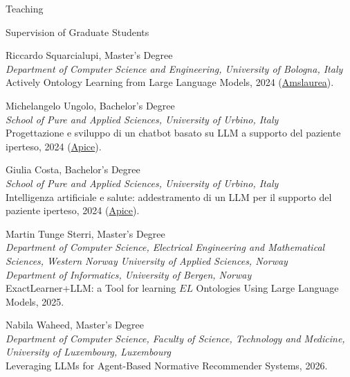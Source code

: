 \documentclass{resume} %
\begin{document}
\begin{rSection}{Teaching}
        \begin{rSubsection2}{Supervision of Graduate Students}

            \item Riccardo Squarcialupi, Master's Degree
            \\ \emph{\small{Department of Computer Science and Engineering, University of Bologna, Italy}}
            \\ Actively Ontology Learning from Large Language Models, 2024 (\href{https://amslaurea.unibo.it/id/eprint/32247/}{Amslaurea}).
            \item Michelangelo Ungolo, Bachelor's Degree
            \\ \emph{\small{School of Pure and Applied Sciences, University of Urbino, Italy}}
            \\ Progettazione e sviluppo di un chatbot basato su LLM a supporto del paziente iperteso, 2024 (\href{https://apice.unibo.it/xwiki/bin/view/Thesis/ChatbotLLMIpertensioneUngolo2024}{Apice}).
            \item Giulia Costa, Bachelor's Degree
            \\ \emph{\small{School of Pure and Applied Sciences, University of Urbino, Italy}}
            \\ Intelligenza artificiale e salute: addestramento di un LLM per il supporto del paziente iperteso, 2024 (\href{https://apice.unibo.it/xwiki/bin/view/Thesis/AddestramentoLLMPerPazienteIpertesoCosta2024}{Apice}).
            \item Martin Tunge Sterri, Master's Degree
            \\\emph{\small{Department of Computer Science, Electrical Engineering and Mathematical Sciences, Western Norway University of Applied Sciences, Norway}}
            \\\emph{\small{Department of Informatics, University of Bergen, Norway}}
            \\ExactLearner+LLM: a Tool for learning $EL$ Ontologies Using Large Language Models, 2025.
            \item Nabila Waheed, Master's Degree
            \\\emph{\small{Department of Computer Science, Faculty of Science, Technology and Medicine, University of Luxembourg, Luxembourg}}
            \\Leveraging LLMs for Agent-Based Normative Recommender Systems, 2026.

        \end{rSubsection2}

    \end{rSection}
\end{document}
